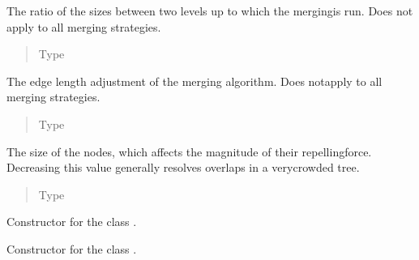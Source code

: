 \documentclass[letterpaper,10pt,english]{sphinxmanual}
\begin{document}
\begin{fulllineitems}
\begin{fulllineitems}
The ratio of the sizes between two levels up to which the mergingis run.  Does not apply to all merging strategies.
\begin{quote}\begin{description}
\item[{Type}] \leavevmode
{}

\end{description}\end{quote}

\end{fulllineitems}



\begin{fulllineitems}
The  edge  length  adjustment  of  the  merging  algorithm.   Does  notapply to all merging strategies.
\begin{quote}\begin{description}
\item[{Type}] \leavevmode
{}

\end{description}\end{quote}

\end{fulllineitems}



\begin{fulllineitems}
The size of the nodes, which affects the magnitude of their repellingforce. Decreasing  this  value  generally  resolves  overlaps  in  a  verycrowded tree.
\begin{quote}\begin{description}
\item[{Type}] \leavevmode
{}

\end{description}\end{quote}

\end{fulllineitems}


Constructor for the class {\hyperref[\detokenize{documentation:tmap.LayoutConfiguration}]{}}.

\begin{fulllineitems}
\label{\detokenize{documentation:tmap.LayoutConfiguration.__init__}}
Constructor for the class {\hyperref[\detokenize{documentation:tmap.LayoutConfiguration}]{}}.

\end{fulllineitems}


\end{fulllineitems}
\end{document}

